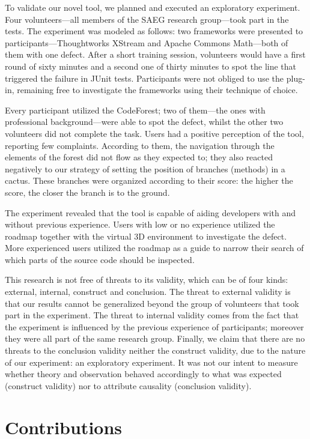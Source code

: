 To validate our novel tool, we planned and executed an exploratory experiment.
Four volunteers---all members of the SAEG research group---took part in the
tests. The experiment was modeled as follows: two frameworks were presented to
participants---Thoughtworks XStream and Apache Commons Math---both of them with
one defect. After a short training session, volunteers would have a first round
of sixty minutes and a second one of thirty minutes to spot the line that
triggered the failure in JUnit tests. Participants were not obliged to use the
plug-in, remaining free to investigate the frameworks using their technique of
choice.

Every participant utilized the CodeForest; two of them---the ones with
professional background---were able to spot the defect, whilst the other two
volunteers did not complete the task. Users had a positive perception of the
tool, reporting few complaints. According to them, the navigation through the
elements of the forest did not flow as they expected to; they also reacted
negatively to our strategy of setting the position of branches (methods) in a
cactus. These branches were organized according to their score: the higher the
score, the closer the branch is to the ground.

The experiment revealed that the tool is capable of aiding developers with and
without previous experience. Users with low or no experience utilized the
roadmap together with the virtual 3D environment to investigate the defect.
More experienced users utilized the roadmap as a guide to narrow their search of
which parts of the source code should be inspected.

This research is not free of threats to its validity, which can be of four
kinds: external, internal, construct and conclusion. The threat to external
validity is that our results cannot be generalized beyond the group of
volunteers that took part in the experiment. The threat to internal validity
comes from the fact that the experiment is influenced by the previous experience
of participants; moreover they were all part of the same research group.
Finally, we claim that there are no threats to the conclusion validity neither
the construct validity, due to the nature of our experiment: an
exploratory experiment. It was not our intent to measure whether theory and
observation behaved accordingly to what was expected (construct validity) nor to
attribute causality (conclusion validity).

\section{Contributions}

